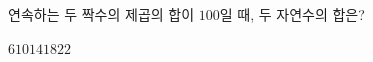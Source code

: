 연속하는 두 짝수의 제곱의 합이 $100$일 때, 두 자연수의 합은?
\begin{choices32}{$6$}{$10$}{$14$}{$18$}{$22$}\end{choices32}
